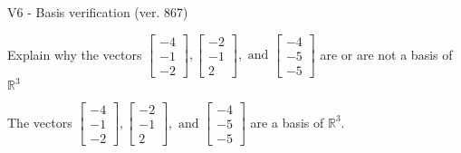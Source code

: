 \begin{exercise}
  \begin{exerciseTitle}V6 - Basis verification (ver. 867)\end{exerciseTitle}
  \begin{exerciseStatement}
    Explain why the vectors \(\left[\begin{array}{r}
-4 \\
-1 \\
-2
\end{array}\right] , \left[\begin{array}{r}
-2 \\
-1 \\
2
\end{array}\right] , \text{ and } \left[\begin{array}{r}
-4 \\
-5 \\
-5
\end{array}\right]\) are or are not a basis of \(\mathbb{R}^3\)	


  \end{exerciseStatement}
  \begin{exerciseAnswer}
   The vectors \(\left[\begin{array}{r}
-4 \\
-1 \\
-2
\end{array}\right] , \left[\begin{array}{r}
-2 \\
-1 \\
2
\end{array}\right] , \text{ and } \left[\begin{array}{r}
-4 \\
-5 \\
-5
\end{array}\right]\) 
  	 are  a basis of \(\mathbb{R}^3\).
  


  \end{exerciseAnswer}
\end{exercise}